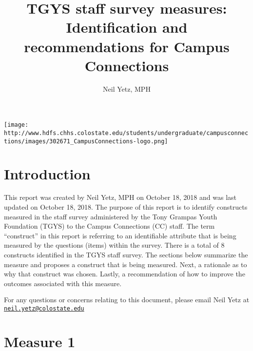 \documentclass[]{article}
\title{TGYS staff survey measures: Identification and recommendations for
Campus Connections}
\author{Neil Yetz, MPH}
\date{}
\begin{document}
\maketitle

{
\setcounter{tocdepth}{2}
\tableofcontents
}
\texttt{[image: http://www.hdfs.chhs.colostate.edu/students/undergraduate/campusconnections/images/302671\_CampusConnections-logo.png]}

\section{Introduction}\label{introduction}

This report was created by Neil Yetz, MPH on October 18, 2018 and was
last updated on October 18, 2018. The purpose of this report is to
identify constructs measured in the staff survey administered by the
Tony Grampas Youth Foundation (TGYS) to the Campus Connections (CC)
staff. The term ``construct'' in this report is referring to an
identifiable attribute that is being measured by the questions (items)
within the survey. There is a total of 8 constructs identified in the
TGYS staff survey. The sections below summarize the measure and proposes
a construct that is being measured. Next, a rationale as to why that
construct was chosen. Lastly, a recommendation of how to improve the
outcomes associated with this measure.

For any questions or concerns relating to this document, please email
Neil Yetz at
\href{mailto:neil.yetz@colostate.edu}{\nolinkurl{neil.yetz@colostate.edu}}

\section{Measure 1}\label{measure-1}
\end{document}
